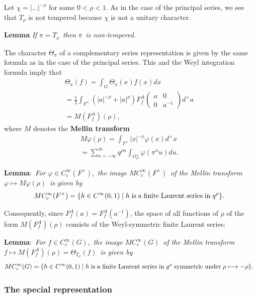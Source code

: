 \documentclass[11pt, a4paper]{article}
\begin{document}
Let $\chi =|...|^{-\rho }$ for some $0<\rho <1$. As in the case of the
principal series, we see that $T_\rho $ is not tempered because $\chi $ is
not a unitary character.

{\bf Lemma} {\em If }$\pi =T_\rho ${\em \ then }$\pi ${\em \ is non-tempered.%
}

The character $\Theta _\pi $ of a complementary series representation
is given by the same formula as in the case of the principal series. This
and the Weyl integration formula imply that
\[
\begin{array}{c}
\Theta _\pi (f)=\int_G\Theta _\pi (x)f(x)dx \\ 
=\frac 12\int_{F^{\times }}(|a|^{-\rho }+|a|^\rho )F_f^A\left( 
\begin{array}{cc}
a & 0 \\ 
0 & a^{-1}
\end{array}
\right)d^{\times }a \\ 
=M(F_f^A)(\rho ),
\end{array}
\]
where $M$ denotes the {\bf Mellin transform}
\[
\begin{array}{c}
M\varphi (\rho )=\int_{F^{\times }}|x|^{-\rho }\varphi (x)d^{\times }x \\ 
=\sum_{n=-\infty }^\infty q^{\rho n}\int_{O_F^{\times }}\varphi (\pi
^nu)du.
\end{array}
\]

{\bf Lemma}:{\em \ For }$\varphi \in C_c^\infty (F^{\times })$,{\em \ the
image }$MC_c^\infty (F^{\times })${\em \ of the Mellin transform }$\varphi
\longmapsto M\varphi (\rho )${\em \ is given by}
\[
MC_c^\infty (F^{\times })=\{h\in C^\infty
(0,1)\;|\;h\;{\rm is\;a\;finite\;Laurent\;series\;in}\;q^\rho \}.
\]

Consequently, since $F_f^A(a)=F_f^A(a^{-1})$, the space of all
functions of $\rho $ of the form $M(F_f^A)(\rho )$ consists of the Weyl-symmetric finite Laurent series:

{\bf Lemma}:{\em \ For }$f\in C_c^\infty (G)$,{\em \ the image }$MC_c^\infty
(G)${\em \ of the Mellin transform }$f\longmapsto M(F_f^A)(\rho )=\Theta _{T_\rho }(f)${\em \ is
given by}
\[
MC_c^\infty (G)=\{h\in C^\infty
(0,1)\;|\;h\;{\rm is\;a\;finite\;Laurent\;series\;in}\;q^\rho \;{\rm symmetric\;under}\;\rho \longmapsto -\rho \}.
\]

\subsubsection{The special representation}
\end{document}
